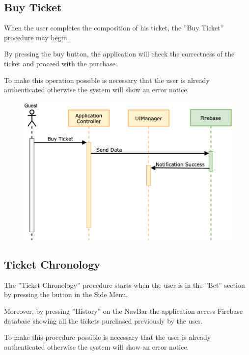 \documentclass[numbers=noenddot, 12pt, a4paper, oneside]{scrbook}
\begin{document}
\newpage

\subsection*{Buy Ticket}
When the user completes the composition of his ticket, the ”Buy Ticket” procedure may begin.

By pressing the buy button, the application will check the correctness of the ticket and proceed with the purchase.

To make this operation possible is necessary that the user is already authenticated otherwise the system will show an error notice.


\begin{figure}[H]
	\centering
	\includegraphics[width=1\textwidth]{images/Sequence/BuyTicket}
\end{figure}

\newpage

\subsection*{Ticket Chronology}
The ”Ticket Chronology” procedure starts when the user is in the ”Bet” section by pressing the button in the Side Menu.

Moreover, by pressing ”History” on the NavBar the application access Firebase database showing all the tickets purchased previously by the user.

To make this procedure possible is necessary that the user is already authenticated otherwise the system will show an error notice.
\end{document}
